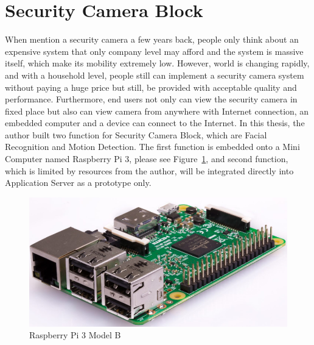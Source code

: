 \section{Security Camera Block}
When mention a security camera a few years back, people only think about an expensive system that only company level may afford and the system is massive itself, which make its mobility extremely low. However, world is changing rapidly, and with a household level, people still can implement a security camera system without paying a huge price but still, be provided with acceptable quality and performance. Furthermore, end users not only can view the security camera in fixed place but also can view camera from anywhere with Internet connection, an embedded computer and a device can connect to the Internet. In this thesis, the author built two function for Security Camera Block, which are Facial Recognition and Motion Detection. The first function is embedded onto a Mini Computer named Raspberry Pi 3, please see Figure~\ref{fig:rpiImage}, and second function, which is limited by resources from the author, will be integrated directly into Application Server as a prototype only.
\begin{figure}[!ht]
  \begin{center}
  \includegraphics[scale=0.72]{images/rpi.png}
  \caption{Raspberry Pi 3 Model B}
  \label{fig:rpiImage}
  \end{center}
\end{figure}

